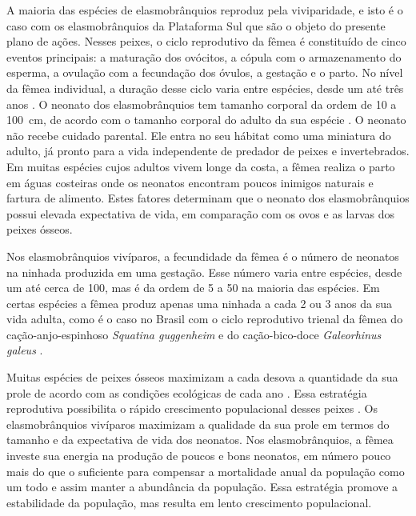 \documentclass[a4paper,11pt,twoside,showtrims,onecolumn,openright,final]{memoir}
\begin{document}
A maioria das espécies de elasmobrânquios reproduz pela viviparidade, 
e isto é o caso com os elasmobrânquios da Plataforma Sul que são o objeto do 
presente plano de ações. Nesses peixes, o ciclo reprodutivo da fêmea 
é constituído de cinco eventos principais: a maturação dos ovócitos, 
a cópula com o armazenamento do esperma, a ovulação com a fecundação dos óvulos, 
a gestação e o parto.  No nível da fêmea individual, a duração  desse ciclo varia entre espécies, 
desde um até três anos \citep{PERES1991}. %
O neonato dos elasmobrânquios tem tamanho corporal da ordem de 10 a 100~cm, de acordo com o 
tamanho corporal do adulto da sua espécie \citep{COMPAGNO1984A,branstetter1990}. %
O neonato não recebe cuidado parental. Ele entra no seu hábitat como uma miniatura do adulto, 
já pronto para a vida independente de predador de peixes e invertebrados. Em muitas espécies 
cujos adultos vivem longe da costa, a fêmea realiza o parto em águas costeiras onde os neonatos 
encontram poucos inimigos naturais e fartura de alimento. Estes fatores determinam que o neonato 
dos elasmobrânquios possui elevada expectativa de vida, em comparação com os ovos e as larvas dos 
peixes ósseos. %

Nos elasmobrânquios vivíparos, a fecundidade da fêmea é o número de neonatos na ninhada produzida 
em uma gestação. Esse número varia entre espécies, desde um até cerca de 100, mas é da ordem de 5 a 50 
na maioria das espécies. Em certas espécies a fêmea produz apenas uma ninhada a cada 2 ou 3 anos 
da sua vida adulta, como é o caso no Brasil com o ciclo reprodutivo trienal da fêmea  
do cação-anjo-espinhoso \emph{Squatina guggenheim}  e 
do cação-bico-doce \emph{Galeorhinus galeus} \citep{PERES1991,silva1996}. %

Muitas espécies de peixes ósseos maximizam a cada desova a quantidade da sua prole de 
acordo com as condições ecológicas de cada ano \citep{nikolskii1969}. 
Essa estratégia reprodutiva possibilita o rápido 
crescimento populacional desses peixes \citep{rothschild1986}. %
Os elasmobrânquios vivíparos  maximizam  a qualidade da sua prole em termos do tamanho e da 
expectativa de vida dos neonatos. Nos elasmobrânquios, a fêmea investe sua energia na produção 
de poucos e bons neonatos, em número pouco mais do que o suficiente para compensar a mortalidade 
anual da população como um todo e assim manter a abundância da população. Essa estratégia promove 
a estabilidade da população, mas resulta em lento crescimento populacional.
\end{document}
